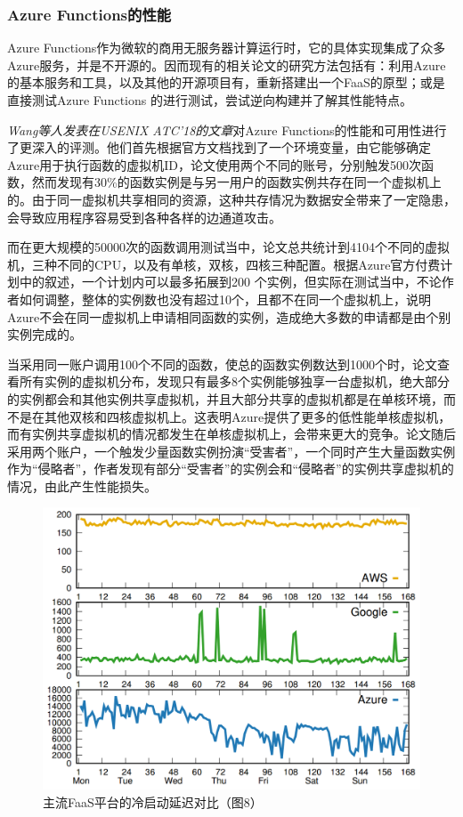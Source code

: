 \documentclass[11pt]{article}
\begin{document}
\subsubsection{Azure Functions的性能}
Azure Functions作为微软的商用无服务器计算运行时，它的具体实现集成了众多Azure服务，并是不开源的。因而现有的相关论文的研究方法包括有：利用Azure的基本服务和工具，以及其他的开源项目有，重新搭建出一个FaaS的原型\cite{mcgrath2017serverless}；或是直接测试Azure Functions 的进行测试，尝试逆向构建并了解其性能特点\cite{wang2018peeking}。

\cite{wang2018peeking}{\textit{Wang等人发表在USENIX ATC’18的文章}}对Azure Functions的性能和可用性进行了更深入的评测。他们首先根据官方文档找到了一个环境变量，由它能够确定Azure用于执行函数的虚拟机ID，论文使用两个不同的账号，分别触发500次函数，然而发现有30\%的函数实例是与另一用户的函数实例共存在同一个虚拟机上的。由于同一虚拟机共享相同的资源，这种共存情况为数据安全带来了一定隐患，会导致应用程序容易受到各种各样的边通道攻击。

而在更大规模的50000次的函数调用测试当中，论文总共统计到4104个不同的虚拟机，三种不同的CPU，以及有单核，双核，四核三种配置。根据Azure官方付费计划中的叙述，一个计划内可以最多拓展到200 个实例，但实际在测试当中，不论作者如何调整，整体的实例数也没有超过10个，且都不在同一个虚拟机上，说明Azure不会在同一虚拟机上申请相同函数的实例，造成绝大多数的申请都是由个别实例完成的。

当\cite{wang2018peeking}采用同一账户调用100个不同的函数，使总的函数实例数达到1000个时，论文查看所有实例的虚拟机分布，发现只有最多8个实例能够独享一台虚拟机，绝大部分的实例都会和其他实例共享虚拟机，并且大部分共享的虚拟机都是在单核环境，而不是在其他双核和四核虚拟机上。这表明Azure提供了更多的低性能单核虚拟机，而有实例共享虚拟机的情况都发生在单核虚拟机上，会带来更大的竞争。论文随后采用两个账户，一个触发少量函数实例扮演“受害者”，一个同时产生大量函数实例作为“侵略者”，作者发现有部分“受害者”的实例会和“侵略者”的实例共享虚拟机的情况，由此产生性能损失。
\begin{figure}[!htbp]
	\centering
	\includegraphics[scale=0.5]{figs/ColdStart.PNG}
	\caption{主流FaaS平台的冷启动延迟对比（\cite{wang2018peeking}图8）}
	\label{figs:cold}
\end{figure}
\end{document}
